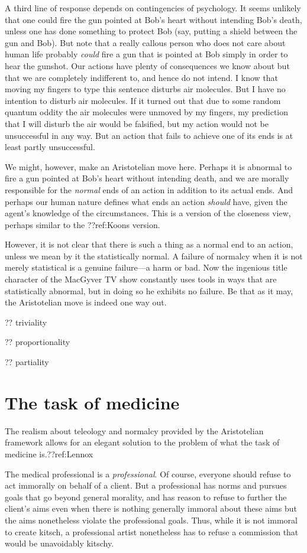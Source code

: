 A third line of response depends on contingencies of psychology. It seems unlikely that one could fire the gun pointed at Bob's heart
without intending Bob's death, unless one has done something to protect Bob (say, putting a shield between the gun and Bob). 
But note that a really callous person who does not care about human life probably \textit{could} fire a gun that is 
pointed at Bob simply in order to hear the gunshot. Our actions have
plenty of consequences we know about but that we are completely indifferent to, and hence do not intend. I know that moving
my fingers to type this sentence disturbs air molecules. But I have no intention to disturb air molecules. If it turned out
that due to some random quantum oddity the air molecules were unmoved by my fingers, my prediction that I will disturb the
air would be falsified, but my action would not be unsuccessful in any way. But an action that fails to achieve one of its
ends is at least partly unsuccessful. 

We might, however, make an Aristotelian move here. Perhaps it is abnormal to fire a gun pointed at Bob's heart without intending
death, and we are morally responsible for the \textit{normal} ends of an action in addition to its actual ends. And perhaps
our human nature defines what ends an action \textit{should} have, given the agent's knowledge of the circumstances.
This is a version of the closeness view, perhaps similar to the ??ref:Koons version. 

However, it is not clear that there is such a thing as a normal end to an action, unless we mean by it the statistically 
normal. A failure of normalcy when it is not merely statistical is a genuine failure---a harm or bad. Now the ingenious title 
character of the MacGyver TV show constantly uses tools in ways that are statistically abnormal, but in doing so he exhibits 
no failure. Be that as it may, the Aristotelian move is indeed one way out.

    ?? triviality

?? proportionality

?? partiality

\section{The task of medicine}
The realism about teleology and normalcy provided by the Aristotelian framework
allows for an elegant solution to the problem of what the task of medicine is.??ref:Lennox

The medical professional is a \textit{professional}. Of course, everyone should refuse to act immorally on behalf of a client. But a professional has norms
and pursues goals that go beyond general morality, and has reason to refuse to further the client's aims even when there is nothing generally immoral about
these aims but the aims nonetheless violate the professional goals. Thus, while it is not immoral to create kitsch, a professional artist nonetheless has
to refuse a commission that would be unavoidably kitschy.

